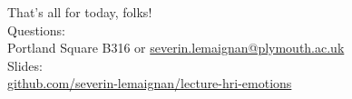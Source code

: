 \documentclass[compress]{beamer}
\makeatletter
\def\beamer@writeslidentry@miniframesoff{%
  \expandafter\beamer@ifempty\expandafter{\beamer@framestartpage}{}%
  {%
    \clearpage\beamer@notesactions%
  }
}
\newcommand*{\miniframesoff}{\let\beamer@writeslidentry=\beamer@writeslidentry@miniframesoff}
\makeatother
\begin{document}
\miniframesoff

\begin{frame}{}
    \begin{center}
        \Large
        That's all for today, folks!\\[2em]
        \normalsize
        Questions:\\
        Portland Square B316 or \url{severin.lemaignan@plymouth.ac.uk} \\[1em]

        Slides:\\
        \href{https://github.com/severin-lemaignan/lecture-hri-emotions}{\small
        github.com/severin-lemaignan/lecture-hri-emotions}

    \end{center}
\end{frame}
\end{document}
